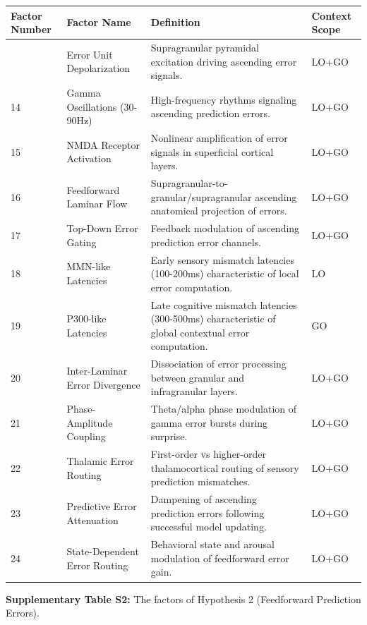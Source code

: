 \documentclass[12pt]{article}
\begin{document}
\begin{longtable}[]{@{}llll@{}}
\toprule
\textbf{Factor Number} & \textbf{Factor Name} & \textbf{Definition} & \textbf{Context Scope} \\
\midrule
\endhead
\bottomrule
\endlastfoot
13 & Error Unit Depolarization & Supragranular pyramidal excitation driving ascending error signals. & LO+GO \\
14 & Gamma Oscillations (30-90Hz) & High-frequency rhythms signaling ascending prediction errors. & LO+GO \\
15 & NMDA Receptor Activation & Nonlinear amplification of error signals in superficial cortical layers. & LO+GO \\
16 & Feedforward Laminar Flow & Supragranular-to-granular/supragranular ascending anatomical projection of errors. & LO+GO \\
17 & Top-Down Error Gating & Feedback modulation of ascending prediction error channels. & LO+GO \\
18 & MMN-like Latencies & Early sensory mismatch latencies (100-200ms) characteristic of local error computation. & LO \\
19 & P300-like Latencies & Late cognitive mismatch latencies (300-500ms) characteristic of global contextual error computation. & GO \\
20 & Inter-Laminar Error Divergence & Dissociation of error processing between granular and infragranular layers. & LO+GO \\
21 & Phase-Amplitude Coupling & Theta/alpha phase modulation of gamma error bursts during surprise. & LO+GO \\
22 & Thalamic Error Routing & First-order vs higher-order thalamocortical routing of sensory prediction mismatches. & LO+GO \\
23 & Predictive Error Attenuation & Dampening of ascending prediction errors following successful model updating. & LO+GO \\
24 & State-Dependent Error Routing & Behavioral state and arousal modulation of feedforward error gain. & LO+GO \\
\end{longtable}

\textbf{Supplementary Table S2:} The factors of Hypothesis 2 (Feedforward Prediction Errors).
\end{document}
